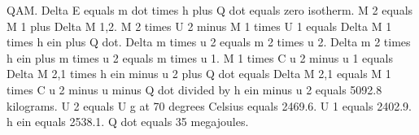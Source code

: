 QAM. Delta E equals m dot times h plus Q dot equals zero isotherm. M 2 equals M 1 plus Delta M 1,2. M 2 times U 2 minus M 1 times U 1 equals Delta M 1 times h ein plus Q dot. Delta m times u 2 equals m 2 times u 2. Delta m 2 times h ein plus m times u 2 equals m times u 1. M 1 times C u 2 minus u 1 equals Delta M 2,1 times h ein minus u 2 plus Q dot equals Delta M 2,1 equals M 1 times C u 2 minus u minus Q dot divided by h ein minus u 2 equals 5092.8 kilograms. U 2 equals U g at 70 degrees Celsius equals 2469.6. U 1 equals 2402.9. h ein equals 2538.1. Q dot equals 35 megajoules.